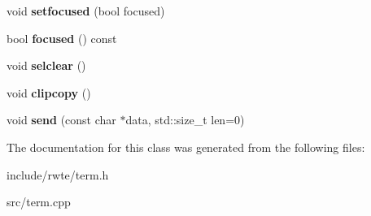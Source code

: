 \begin{DoxyCompactItemize}
void {\bfseries setfocused} (bool focused)
\item 
\mbox{\label{classTerm_ac78e9fd9833981d2681d50cc78a04ab4}} 
bool {\bfseries focused} () const
\item 
\mbox{\label{classTerm_a07e21ed89ef5da2a6020d225f22bce2e}} 
void {\bfseries selclear} ()
\item 
\mbox{\label{classTerm_ace0703455819839e9ec6adf64d8d0f56}} 
void {\bfseries clipcopy} ()
\item 
\mbox{\label{classTerm_ab59875ddaa6f833135e7b2b780214eb1}} 
void {\bfseries send} (const char $\ast$data, std\+::size\+\_\+t len=0)
\end{DoxyCompactItemize}


The documentation for this class was generated from the following files\+:\begin{DoxyCompactItemize}
\item 
include/rwte/term.\+h\item 
src/term.\+cpp\end{DoxyCompactItemize}
